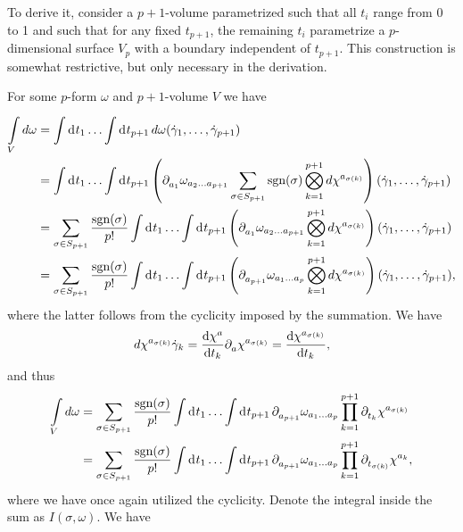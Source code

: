 To derive it, consider a $p + 1$-volume parametrized such that all $t_{i}$ range from 0 to 1 and such that for any fixed $t_{p + 1}$, the remaining $t_{i}$ parametrize a $p$-dimensional surface $V_{p}$ with a boundary independent of $t_{p + 1}$. This construction is somewhat restrictive, but only necessary in the derivation.

For some $p$-form $\omega$ and $p + 1$-volume $V$ we have
\begin{align*}
\minteg{V}{d\omega} &= \integ{}{}{t_{1}}{\dots \integ{}{}{t_{p + 1}}{d\omega(\dot{\gamma}_{1},\dots, \dot{\gamma}_{p + 1})}} \\
&= \integ{}{}{t_{1}}{\dots \integ{}{}{t_{p + 1}}{\left(\del{a_{1}}{\omega_{a_{2}\dots a_{p + 1}}}\sum\limits_{\sigma\in S_{p + 1}}\text{sgn}(\sigma)\bigotimes_{k = 1}^{p + 1}d\chi^{a_{\sigma(k)}}\right)(\dot{\gamma}_{1},\dots, \dot{\gamma}_{p + 1})}} \\
&= \sum\limits_{\sigma\in S_{p + 1}}\frac{\text{sgn}(\sigma)}{p!}\integ{}{}{t_{1}}{\dots \integ{}{}{t_{p + 1}}{\left(\del{a_{1}}{\omega_{a_{2}\dots a_{p + 1}}}\bigotimes_{k = 1}^{p + 1}d\chi^{a_{\sigma(k)}}\right)(\dot{\gamma}_{1},\dots, \dot{\gamma}_{p + 1})}} \\
&= \sum\limits_{\sigma\in S_{p + 1}}\frac{\text{sgn}(\sigma)}{p!}\integ{}{}{t_{1}}{\dots \integ{}{}{t_{p + 1}}{\left(\del{a_{p + 1}}{\omega_{a_{1}\dots a_{p}}}\bigotimes_{k = 1}^{p + 1}d\chi^{a_{\sigma(k)}}\right)(\dot{\gamma}_{1},\dots, \dot{\gamma}_{p + 1})}},
\end{align*}
where the latter follows from the cyclicity imposed by the summation. We have
\begin{align*}
d\chi^{a_{\sigma(k)}}{\dot{\gamma}_{k}} = \dv{\chi^{a}}{t_{k}}\partial^{}_{a}\chi^{a_{\sigma(k)}} = \dv{\chi^{a_{\sigma(k)}}}{t_{k}},
\end{align*}
and thus
\begin{align*}
\minteg{V}{d\omega} &= \sum\limits_{\sigma\in S_{p + 1}}\frac{\text{sgn}(\sigma)}{p!}\integ{}{}{t_{1}}{\dots \integ{}{}{t_{p + 1}}{\del{a_{p + 1}}{\omega_{a_{1}\dots a_{p}}}\prod\limits_{k = 1}^{p + 1}\del{t_{k}}{\chi^{a_{\sigma(k)}}}}} \\
&= \sum\limits_{\sigma\in S_{p + 1}}\frac{\text{sgn}(\sigma)}{p!}\integ{}{}{t_{1}}{\dots \integ{}{}{t_{p + 1}}{\del{a_{p + 1}}{\omega_{a_{1}\dots a_{p}}}\prod\limits_{k = 1}^{p + 1}\del{t_{\sigma(k)}}{\chi^{a_{k}}}}},
\end{align*}
where we have once again utilized the cyclicity. Denote the integral inside the sum as $I(\sigma, \omega)$. We have

